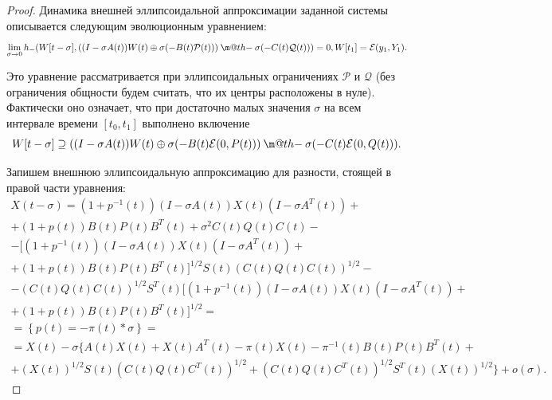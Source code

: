 \documentclass[12pt]{article}
\makeatletter
\theoremstyle{rusdef}
\newcommand{\scalar}[2]{\left<#1,#2\right>}
\newcommand{\E}{\ensuremath{\mathcal{E}}} %
\newcommand{\dotminus}{\mathbin{\text{\@dotminus}}}
\newcommand{\@dotminus}{%
	\ooalign{\hidewidth\raise1ex\hbox{.}\hidewidth\cr$\m@th-$\cr}%
}
\makeatother
\begin{document}
\begin{proof}
Динамика внешней эллипсоидальной аппроксимации заданной системы описывается следующим эволюционным уравнением:
$$
\lim\limits_{\sigma \to 0} h_{-} (W[t-\sigma],((I-\sigma A(t))W(t) \oplus \sigma (-B(t) \mathcal{P}(t))) \dotminus \sigma(-C(t)\mathcal{Q}(t))) = 0, W[t_1] = \E(y_1,Y_1).
$$

Это уравнение рассматривается при эллипсоидальных ограничениях $\mathcal{P}$ и $\mathcal{Q}$ (без ограничения общности будем считать, что их центры расположены в нуле). Фактически оно означает, что при достаточно малых значения $\sigma$ на всем интервале времени $[t_0,t_1]$ выполнено включение
$$
W[t-\sigma] \supseteq ((I-\sigma A(t))W(t) \oplus \sigma (-B(t) \E(0,P(t))) \dotminus \sigma(-C(t)\E(0,Q(t))).
$$

Запишем внешнюю эллипсоидальную аппроксимацию для разности, стоящей в правой части уравнения:
\begin{multline*}
X(t-\sigma) = (1+p^{-1}(t))(I-\sigma A(t))X(t)(I-\sigma A^T(t)) +\\+
(1+p(t)) B(t)P(t)B^T(t) + \sigma^2 C(t)Q(t)C(t) -\\-
[(1+p^{-1}(t))(I-\sigma A(t))X(t)(I-\sigma A^T(t)) +\\+
(1+p(t)) B(t)P(t)B^T(t)]^{1/2}S(t)(C(t)Q(t)C(t))^{1/2} -\\-
(C(t)Q(t)C(t))^{1/2}S^T(t)[(1+p^{-1}(t))(I-\sigma A(t))X(t)(I-\sigma A^T(t)) +\\+
(1+p(t)) B(t)P(t)B^T(t)]^{1/2} =\\=
 \left\{ p(t) = -\pi(t)*\sigma \right\} = \\ =
 X(t) - \sigma\{A(t)X(t) + X(t)A^T(t) - \pi(t)X(t) - \pi^{-1}(t)B(t)P(t)B^T(t) +\\+ (X(t))^{1/2}S(t)(C(t)Q(t)C^T(t))^{1/2} + (C(t)Q(t)C^T(t))^{1/2}S^T(t)(X(t))^{1/2}\} + o(\sigma).
\end{multline*}


\end{proof}
\end{document}
